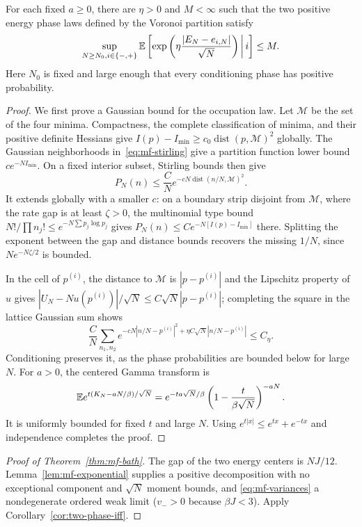 \begin{lemma}
\label{lem:mf-exponential}
For each fixed $a\ge0$, there are $\eta>0$ and $M<\infty$ such that
the two positive energy phase laws defined by the Voronoi partition
satisfy
\begin{equation}
 \sup_{N\ge N_0,i\in\{-,+\}}
 \mathbb E\left[\exp\left(\eta\frac{|E_N-e_{i,N}|}{\sqrt N}\right)
       \,\middle|\,i\right]\le M.
 \label{eq:mf-moment-bound}
\end{equation}
Here $N_0$ is fixed and large enough that every conditioning phase has
positive probability.
\end{lemma}
\begin{proof}
We first prove a Gaussian bound for the occupation law. Let
$\mathcal M$ be the set of the four minima. Compactness, the complete
classification of minima, and their positive definite Hessians give
$I(p)-I_{\min}\ge c_0\operatorname{dist}(p,\mathcal M)^2$ globally.
The Gaussian neighborhoods in~\eqref{eq:mf-stirling} give a partition
function lower bound $c e^{-NI_{\min}}$. On a fixed interior subset,
Stirling bounds then give
\[
 P_N(n)\le\frac CN e^{-cN\operatorname{dist}(n/N,\mathcal M)^2}.
\]
It extends globally with a smaller $c$: on a boundary strip disjoint
from $\mathcal M$, where the rate gap is at least $\zeta>0$, the
multinomial type bound
$N!/\prod n_j!\le e^{-N\sum p_j\log p_j}$ gives
$P_N(n)\le C e^{-N[I(p)-I_{\min}]}$ there. Splitting the exponent
between the gap and distance bounds recovers the missing $1/N$, since
$N e^{-N\zeta/2}$ is bounded.

In the cell of $p^{(i)}$, the distance to $\mathcal M$ is
$|p-p^{(i)}|$ and the Lipschitz property of $u$ gives
$|U_N-Nu(p^{(i)})|/\sqrt N\le C\sqrt N|p-p^{(i)}|$; completing
the square in the lattice Gaussian sum shows
\[
 \frac CN\sum_{n_1,n_2}
 e^{-cN|n/N-p^{(i)}|^2+\eta C\sqrt N|n/N-p^{(i)}|}\le C_\eta.
\]
Conditioning preserves it, as the phase probabilities are bounded
below for large $N$. For $a>0$, the centered Gamma transform is
\[
 \mathbb E e^{t(K_N-aN/\beta)/\sqrt N}
 =e^{-ta\sqrt N/\beta}
   \left(1-\frac{t}{\beta\sqrt N}\right)^{-aN}.
\]
It is uniformly bounded for fixed $t$ and large $N$. Using
$e^{t|x|}\le e^{tx}+e^{-tx}$ and independence completes the proof.
\end{proof}

\begin{proof}[Proof of Theorem~\ref{thm:mf-bath}]
The gap of the two energy centers is $NJ/12$.
Lemma~\ref{lem:mf-exponential} supplies a positive decomposition with
no exceptional component and $\sqrt N$ moment bounds, and
\eqref{eq:mf-variances} a nondegenerate ordered weak limit
($v_->0$ because $\beta J<3$).
Apply Corollary~\ref{cor:two-phase-iff}.
\end{proof}

